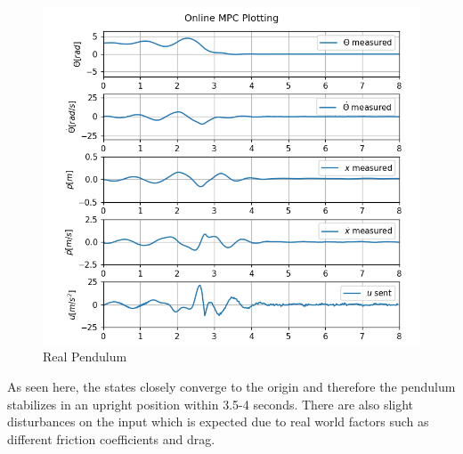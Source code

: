 \begin{figure}[H]
	\centering
	\includegraphics[width=\textwidth]{"src/Images/Real_Pendulum_OnlinePlot.png"}
	\caption{Real Pendulum}
	\label{fig:Real Pendulum Plot}
\end{figure}

As seen here, the states closely converge to the origin and therefore the pendulum stabilizes in an upright position within 3.5-4 seconds. There are also slight disturbances on the input which is expected due to real world factors such as different friction coefficients and drag. 


